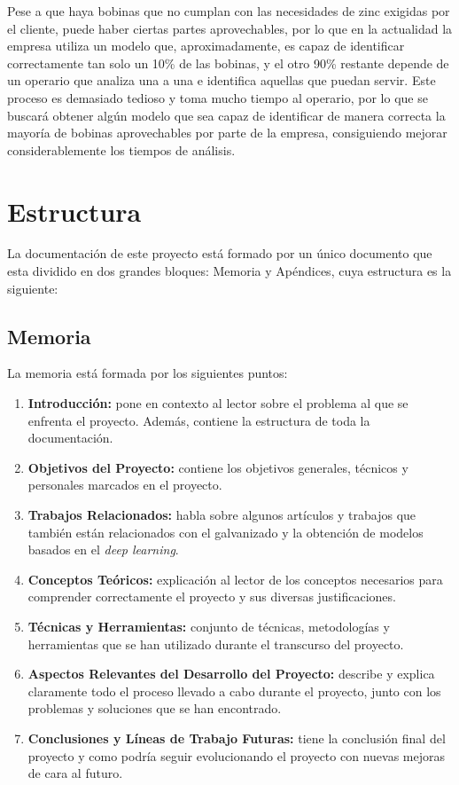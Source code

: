 Pese a que haya bobinas que no cumplan con las necesidades de zinc exigidas por el cliente, puede haber ciertas partes aprovechables, por lo que en la actualidad la empresa utiliza un modelo que, aproximadamente, es capaz de identificar correctamente tan solo un 10\% de las bobinas, y el otro 90\% restante depende de un operario que analiza una a una e identifica aquellas que puedan servir. Este proceso es demasiado tedioso y toma mucho tiempo al operario, por lo que se buscará obtener algún modelo que sea capaz de identificar de manera correcta la mayoría de bobinas aprovechables por parte de la empresa, consiguiendo mejorar considerablemente los tiempos de análisis. 

\section{Estructura}
La documentación de este proyecto está formado por un único documento que esta dividido en dos grandes bloques: Memoria y Apéndices, cuya estructura es la siguiente:

\subsection{Memoria}
La memoria está formada por los siguientes puntos:
\begin{enumerate}
    \item \textbf{Introducción:} pone en contexto al lector sobre el problema al que se enfrenta el proyecto. Además, contiene la estructura de toda la documentación.
    \item \textbf{Objetivos del Proyecto:} contiene los objetivos generales, técnicos y personales marcados en el proyecto.
    \item \textbf{Trabajos Relacionados:} habla sobre algunos artículos y trabajos que también están relacionados con el galvanizado y la obtención de modelos basados en el \emph{deep learning}.
    \item \textbf{Conceptos Teóricos:} explicación al lector de los conceptos necesarios para comprender correctamente el proyecto y sus diversas justificaciones.
    \item \textbf{Técnicas y Herramientas:} conjunto de técnicas, metodologías y herramientas que se han utilizado durante el transcurso del proyecto.
    \item \textbf{Aspectos Relevantes del Desarrollo del Proyecto:} describe y explica claramente todo el proceso llevado a cabo durante el proyecto, junto con los problemas y soluciones que se han encontrado.
    \item \textbf{Conclusiones y Líneas de Trabajo Futuras:} tiene la conclusión final del proyecto y como podría seguir evolucionando el proyecto con nuevas mejoras de cara al futuro.
\end{enumerate}

